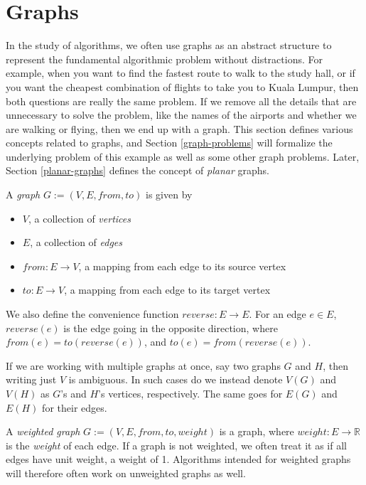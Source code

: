\section{Graphs}
\label{graphs}
In the study of algorithms, we often use graphs as an abstract structure to represent the fundamental algorithmic problem without distractions. For example, when you want to find the fastest route to walk to the study hall, or if you want the cheapest combination of flights to take you to Kuala Lumpur, then both questions are really the same problem. If we remove all the details that are unnecessary to solve the problem, like the names of the airports and whether we are walking or flying, then we end up with a graph. This section defines various concepts related to graphs, and Section \ref{graph-problems} will formalize the underlying problem of this example as well as some other graph problems. Later, Section \ref{planar-graphs} defines the concept of \emph{planar} graphs.

\begin{definition}[Graph]
    A \emph{graph} $G := (V, E, from, to)$ is given by
\begin{itemize}
    \item $V$, a collection of \emph{vertices}
    \item $E$, a collection of \emph{edges}
    \item $from : E \rightarrow V$, a mapping from each edge to its source vertex
    \item $to : E \rightarrow V$, a mapping from each edge to its target vertex 
\end{itemize}
\end{definition}

We also define the convenience function $reverse : E \rightarrow E$. For an edge $e \in E$, $reverse(e)$ is the edge going in the opposite direction, where $from(e) = to(reverse(e))$, and $to(e) = from(reverse(e))$.

If we are working with multiple graphs at once, say two graphs $G$ and $H$, then writing just $V$ is ambiguous. In such cases do we instead denote $V(G)$ and $V(H)$ as $G$'s and $H$'s vertices, respectively. The same goes for $E(G)$ and $E(H)$ for their edges.

\begin{definition}
    A \emph{weighted graph} $G := (V, E, from, to, weight)$ is a graph, where $weight : E \rightarrow \mathbb{R}$ is the \emph{weight} of each edge. If a graph is not weighted, we often treat it as if all edges have unit weight, a weight of 1. Algorithms intended for weighted graphs will therefore often work on unweighted graphs as well.
\end{definition}

